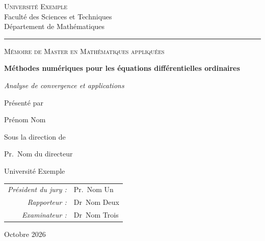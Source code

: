 \begin{titlepage}
  \centering
  {\scshape\Large Université Exemple}\\[3pt]
  {\small Faculté des Sciences et Techniques\\ Département de Mathématiques}\par
  \vspace{8pt}
  {\color{wine}\rule{\textwidth}{1.2pt}}\par
  \vspace{2.4cm}

  {\small\scshape Mémoire de Master en Mathématiques appliquées}\par
  \vspace{1.1cm}
  {\fontsize{26}{32}\selectfont\bfseries Méthodes numériques pour les équations différentielles ordinaires\par}
  \vspace{10pt}
  {\Large\itshape Analyse de convergence et applications\par}

  \vspace{1.6cm}
  \par

  \vspace{1.6cm}
  {\small Présenté par}\par
  \vspace{4pt}
  {\LARGE Prénom Nom\par}

  \vspace{1.6cm}
  {\small Sous la direction de}\par
  \vspace{4pt}
  {\large Pr.~Nom du directeur\par}
  {\small Université Exemple}\par

  \vfill
  \begin{tabular}{@{}rl@{}}
    \itshape Président du jury : & Pr.~Nom Un\\
    \itshape Rapporteur :        & Dr~Nom Deux\\
    \itshape Examinateur :       & Dr~Nom Trois
  \end{tabular}\par
  \vspace{1.2cm}
  {\small Octobre 2026}
\end{titlepage}
